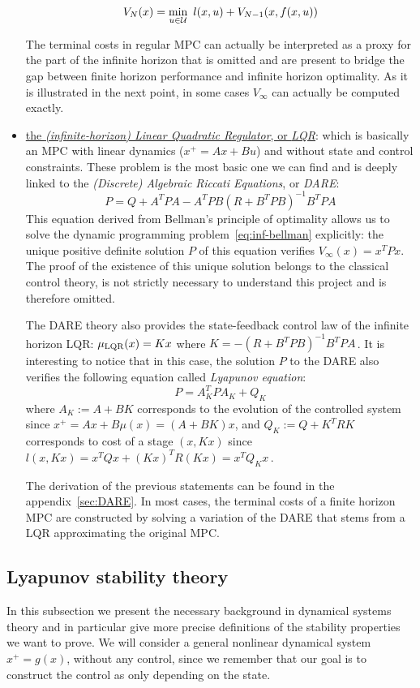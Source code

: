 \documentclass[12pt]{article}
\begin{document}
\begin{itemize}[label=\textbullet]
	$$V_N(x)=\min_{u\in\cal{U}}~l(x,u)+V_{N-1}(x,f(x,u))$$

	The terminal costs in regular MPC can actually be interpreted as a proxy for the part of the infinite horizon that is omitted and are present to bridge the gap between finite horizon performance and infinite horizon optimality.
	As it is illustrated in the next point, in some cases $V_\infty$ can actually be computed exactly.


	\item\underline{the \textit{(infinite-horizon) Linear Quadratic Regulator}, or \textit{LQR}}:\newline
	which is basically an MPC with linear dynamics ($x^+=Ax+Bu$) and without state and control constraints.
	These problem is the most basic one we can find and is deeply linked to the  \textit{(Discrete) Algebraic Riccati Equations}, or \textit{DARE}:
	\begin{equation}
		\label{eq:DARE-LQR}
		P=Q+A^TPA-A^TPB(R+B^TPB)^{-1}B^TPA
	\end{equation}
	This equation derived from Bellman's principle of optimality allows us to solve the dynamic programming problem~\ref{eq:inf-bellman} explicitly: the unique positive definite solution $P$ of this equation verifies $V_\infty(x)=x^TPx$.
	The proof of the existence of this unique solution belongs to the classical control theory, is not strictly necessary to understand this project and is therefore omitted.


	The DARE theory also provides the state-feedback control law of the infinite horizon LQR: $\mu_{\rm{LQR}}(x)=Kx$ where $K=-(R+B^TPB)^{-1}B^TPA$\,.
	It is interesting to notice that in this case, the solution $P$ to the DARE also verifies the following equation called \textit{Lyapunov equation}:
	$$P=A_K^TPA_K+Q_K$$
	where $A_K:=A+BK$ corresponds to the evolution of the controlled system since $x^+=Ax+B\mu(x)=(A+BK)x$, and $Q_K:=Q+K^TRK$ corresponds to cost of a stage $(x,Kx)$ since $l(x,Kx)=x^TQx+(Kx)^TR(Kx)=x^TQ_Kx$\,.

	The derivation of the previous statements can be found in the appendix~\ref{sec:DARE}.
	In most cases, the terminal costs of a finite horizon MPC are constructed by solving a variation of the DARE that stems from a LQR approximating the original MPC.
\end{itemize}


\subsection{Lyapunov stability theory}\label{sec:Lyapunov-stability-theory}
In this subsection we present the necessary background in dynamical systems theory and in particular give more precise definitions of the stability properties we want to prove.
We will consider a general nonlinear dynamical system $x^+=g(x)$, without any control, since we remember that our goal is to construct the control as only depending on the state.
\end{document}

